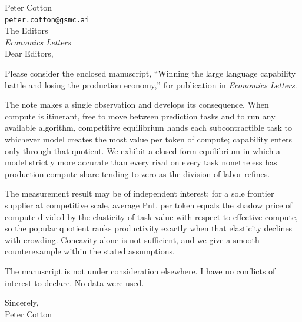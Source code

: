 \documentclass[11pt]{article}
\begin{document}
\noindent
Peter Cotton\\
\texttt{peter.cotton@gsmc.ai}\\[2em]

\noindent
The Editors\\
\emph{Economics Letters}\\[2em]

\noindent
Dear Editors,

\medskip

Please consider the enclosed manuscript, ``Winning the large language capability battle and losing the production economy,'' for publication in \emph{Economics Letters}.

The note makes a single observation and develops its consequence. When compute is itinerant, free to move between prediction tasks and to run any available algorithm, competitive equilibrium hands each subcontractible task to whichever model creates the most value per token of compute; capability enters only through that quotient. We exhibit a closed-form equilibrium in which a model strictly more accurate than every rival on every task nonetheless has production compute share tending to zero as the division of labor refines.

The measurement result may be of independent interest: for a sole frontier supplier at competitive scale, average PnL per token equals the shadow price of compute divided by the elasticity of task value with respect to effective compute, so the popular quotient ranks productivity exactly when that elasticity declines with crowding. Concavity alone is not sufficient, and we give a smooth counterexample within the stated assumptions.

The manuscript is not under consideration elsewhere. I have no conflicts of interest to declare. No data were used.

\medskip

\noindent
Sincerely,\\[1em]
Peter Cotton
\end{document}
